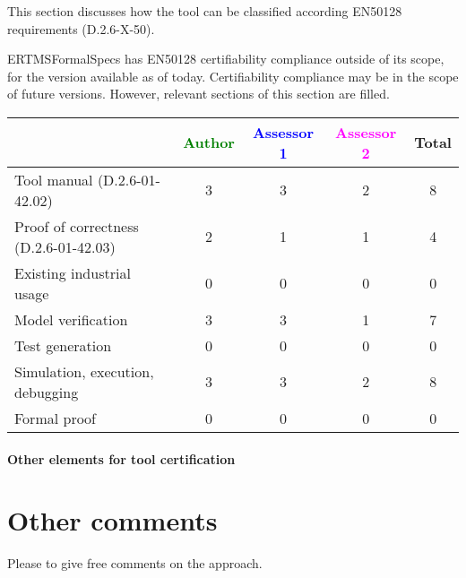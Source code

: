 This section discusses how the tool can be classified according EN50128 requirements (D.2.6-X-50).

\begin{author_comment}
ERTMSFormalSpecs has EN50128 certifiability compliance outside of its scope, for the version available as of today. Certifiability compliance may be in the scope of future versions. However, relevant sections of this section are filled.
\end{author_comment}

\begin{tabular}{|l | c | c | c | c|}
\hline
& \textcolor{green}{Author} & \textcolor{blue}{Assessor 1} & \textcolor{magenta}{Assessor 2} & Total \\
\hline 
Tool manual (D.2.6-01-42.02) & 3 & 3 & 2 & 8  \\
\hline
Proof of correctness (D.2.6-01-42.03) & 2 & 1 & 1 & 4 \\
\hline
Existing industrial  usage &  0 & 0 & 0 & 0 \\
\hline
Model verification & 3 & 3 & 1 & 7 \\
\hline
Test generation & 0 & 0 & 0 & 0 \\
\hline
Simulation, execution, debugging & 3 & 3 & 2 & 8 \\
\hline
Formal proof & 0 & 0 & 0 & 0 \\
\hline
\end{tabular}

\paragraph{Other elements for tool certification}

\section{Other comments}
Please to  give free comments on the approach.

